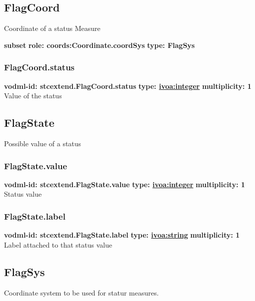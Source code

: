   \subsection{FlagCoord}
  \label{sect:stcextend.FlagCoord}
    Coordinate of a status Measure

    \noindent \textbf{subset} \newline
    \indent   \textbf{role: coords:Coordinate.coordSys} \newline
    \indent   \textbf{type: FlagSys} \newline


    \subsubsection{FlagCoord.status}
      \textbf{vodml-id: stcextend.FlagCoord.status} \newline
      \textbf{type: \hyperref[sect:ivoa]{ivoa:integer}} \newline
      \textbf{multiplicity: 1} \newline 
      Value of the status

  \subsection{FlagState}
  \label{sect:stcextend.FlagState}
    Possible value of a status

    \subsubsection{FlagState.value}
      \textbf{vodml-id: stcextend.FlagState.value} \newline
      \textbf{type: \hyperref[sect:ivoa]{ivoa:integer}} \newline
      \textbf{multiplicity: 1} \newline 
      Status value

    \subsubsection{FlagState.label}
      \textbf{vodml-id: stcextend.FlagState.label} \newline
      \textbf{type: \hyperref[sect:ivoa]{ivoa:string}} \newline
      \textbf{multiplicity: 1} \newline 
      Label attached to that status value

  \subsection{FlagSys}
  \label{sect:stcextend.FlagSys}
    Coordinate system to be used for statur measures.

